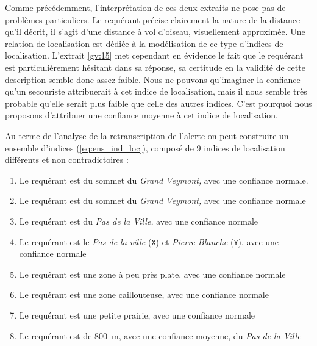 Comme précédemment, l'interprétation de ces deux extraits ne pose pas
de problèmes particuliers. Le requérant précise clairement la nature
de la distance qu'il décrit, il s'agit d'une distance à vol d'oiseau,
visuellement approximée. Une relation de localisation
 est dédiée à
la modélisation de ce type d'indices de localisation. L'extrait
\ref{gv:15} met cependant en évidence le fait que le requérant est
particulièrement hésitant dans sa réponse, sa certitude en la validité
de cette description semble donc assez faible. Nous ne pouvons
qu'imaginer la confiance qu'un secouriste attribuerait à cet indice de
localisation, mais il nous semble très probable qu'elle serait plus
faible que celle des autres indices. C'est pourquoi nous proposons
d'attribuer une confiance moyenne à cet indice de localisation.

Au terme de l'analyse de la retranscription de l'alerte on peut
construire un ensemble d'indices (\autoref{eq:ens_ind_loc}), composé
de 9 indices de localisation différents et non contradictoires :
% 
\begin{enumerate}
\item \label{ind:gv1} Le requérant est
   du sommet du \emph{Grand
    Veymont,} avec une confiance normale.
\item \label{ind:gv2} Le requérant est  du
  sommet du \emph{Grand Veymont,} avec une confiance normale
\item \label{ind:gv3} Le requérant est
   du \emph{Pas de la Ville,} avec
  une confiance normale
\item \label{ind:gv5} Le requérant est  le
  \emph{Pas de la ville} (\texttt{X}) et \emph{Pierre Blanche}
  (\texttt{Y}), avec une confiance normale
\item \label{ind:gv6} Le requérant est 
  une zone à peu près plate, avec une confiance normale
\item \label{ind:gv7} Le requérant est 
  une zone caillouteuse, avec une confiance normale
\item \label{ind:gv8} Le requérant est 
  une petite prairie, avec une confiance normale
\item \label{ind:gv9} Le requérant est
   de \SI{800}{\meter}, avec une
  confiance moyenne, du \emph{Pas de la Ville}
\end{enumerate}

